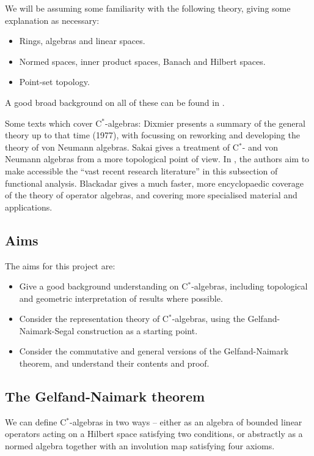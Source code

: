 \documentclass[12pt,a4paper]{amsart}
\theoremstyle{plain}
\theoremstyle{definition}
\begin{document}
	We will be assuming some familiarity with the following theory, giving some explanation as necessary:
\begin{itemize}
	\item Rings, algebras and linear spaces.
	\item Normed spaces, inner product spaces, Banach and Hilbert spaces.
	\item Point-set topology.
\end{itemize}
	A good broad background on all of these can be found in \cite{simmons83}.

	Some texts which cover C$^\ast$-algebras: 
	Dixmier \cite{dixmier77} presents a summary of the general theory up to that time (1977), with \cite{dixmier81} focussing on reworking and developing the theory of von Neumann algebras. 
	Sakai \cite{sakai71} gives a treatment of C$^\ast$- and von Neumann algebras from a more topological point of view.
	In \cite{kadison83,kadison86}, the authors aim to make accessible the ``vast recent research literature'' in this subsection of functional analysis.
	Blackadar \cite{blackadar06} gives a much faster, more encyclopaedic coverage of the theory of operator algebras, and covering more specialised material and applications.
	

\subsection{Aims}
	The aims for this project are:
\begin{itemize}
	\item Give a good background understanding on C$^\ast$-algebras, including topological and geometric interpretation of results where possible.
	\item Consider the representation theory of C$^\ast$-algebras, using the Gelfand-Naimark-Segal construction as a starting point.
	\item Consider the commutative and general versions of the Gelfand-Naimark theorem, and understand their contents and proof.
\end{itemize}
	
	
\subsection{The Gelfand-Naimark theorem}
	We can define C$^\ast$-algebras in two ways -- either as an algebra of bounded linear operators acting on a Hilbert space satisfying two conditions, or abstractly as a normed algebra together with an involution map satisfying four axioms.
\end{document}
